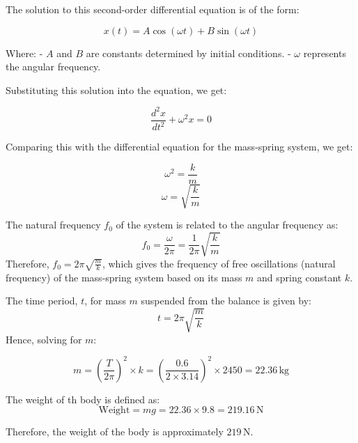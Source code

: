 \documentclass[journal,12pt,twocolumn]{IEEEtran}
\theoremstyle{remark}
\begin{document}
The solution to this second-order differential equation is of the form:

\begin{equation}
x(t) = A\cos(\omega t) + B\sin(\omega t) 
\end{equation}

Where:
- $A$ and $B$ are constants determined by initial conditions.
- $\omega$ represents the angular frequency.

Substituting this solution into the equation, we get:

\begin{equation}
\frac{d^2x}{dt^2} + \omega^2x = 0 
\end{equation}



Comparing this with the differential equation for the mass-spring system, we get:

\begin{equation}
\omega^2 = \frac{k}{m} 
\end{equation}
\begin{equation}
 \omega = \sqrt{\frac{k}{m}} 
\end{equation}

The natural frequency $f_0$ of the system is related to the angular frequency as:
\begin{equation}
 f_0 = \frac{\omega}{2\pi} = \frac{1}{2\pi}\sqrt{\frac{k}{m}} 
\end{equation}
Therefore, $f_0 = 2\pi \sqrt{\frac{m}{k}}$, which gives the frequency of free oscillations (natural frequency) of the mass-spring system based on its mass $m$ and spring constant $k$.


The time period, \( t \), for mass \( m \) suspended from the balance is given by:
\begin{equation}
t = 2\pi\sqrt{\frac{m}{k}}
\end{equation}
Hence, solving for \( m \):

\begin{equation}
m = \left(\frac{T}{2\pi}\right)^2 \times k = \left(\frac{0.6}{2 \times 3.14}\right)^2 \times 2450 = 22.36 \, \text{kg}
\end{equation}

The weight of th body is defined as:
\begin{equation}
\text{Weight} = mg = 22.36 \times 9.8 = 219.16 \, \text{N}
\end{equation}

Therefore, the weight of the body is approximately \(219 \, \text{N}\).
	
\end{document}
